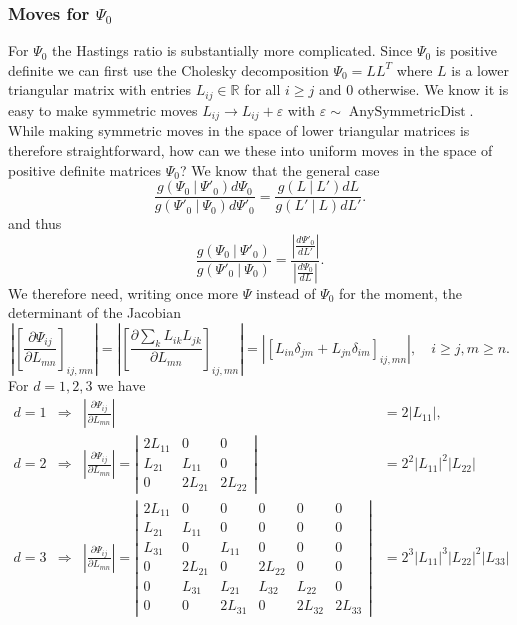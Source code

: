 \documentclass[11pt, oneside]{article}   	%
\begin{document}
\subsubsection{Moves for $\Psi_0$}
For $\Psi_0$ the Hastings ratio is substantially more complicated. Since $\Psi_0$ is positive definite we can first use the Cholesky decomposition $\Psi_0 = L L^T$ where $L$ is a lower triangular matrix with entries $L_{ij}\in\mathbb{R}$ for all $i \ge j$ and $0$ otherwise. We know it is easy to make symmetric moves $L_{ij}\rightarrow L_{ij} + \varepsilon$ with $\varepsilon\sim\operatorname{AnySymmetricDist}$. While making symmetric moves in the space of lower triangular matrices is therefore straightforward, how can we these into uniform moves in the space of positive definite matrices $\Psi_0$? We know that the general case
$$\frac{g(\Psi_0~\vert~\Psi'_0)d\Psi_0}{g(\Psi'_0~\vert~\Psi_0)d\Psi'_0} = \frac{g(L~\vert~L')dL}{g(L'~\vert~L)dL'}.$$
and thus
$$\frac{g(\Psi_0~\vert~\Psi'_0)}{g(\Psi'_0~\vert~\Psi_0)} = \frac{\left\vert\frac{d\Psi'_0}{dL'}\right\vert}{\left\vert\frac{d\Psi_0}{dL}\right\vert}.$$
We therefore need, writing once more $\Psi$ instead of $\Psi_0$ for the moment, the determinant of the Jacobian
$$\left\vert\left[\frac{\partial\Psi_{ij}}{\partial L_{mn}}\right]_{ij,mn}\right\vert = \left\vert\left[\frac{\partial\sum_{k}L_{ik}L_{jk}}{\partial L_{mn}}\right]_{ij,mn}\right\vert = \left\vert\left[L_{in}\delta_{jm} + L_{jn}\delta_{im}\right]_{ij,mn}\right\vert,\quad i\ge j, m\ge n.$$
For $d=1,2,3$ we have
\begin{equation}\begin{aligned}
d = 1 & \Rightarrow & \left\vert\frac{\partial\Psi_{ij}}{\partial L_{mn}}\right\vert &= 2 \vert L_{11}\vert,\\
d = 2 & \Rightarrow & \left\vert\frac{\partial\Psi_{ij}}{\partial L_{mn}}\right\vert = \left\vert\begin{array}{ccc}
2L_{11} & 0 & 0\\
L_{21} & L_{11} & 0 \\
0 & 2L_{21} & 2L_{22}
\end{array}\right\vert &= 2^2 \vert L_{11}\vert^2 \vert L_{22}\vert\\
d = 3 & \Rightarrow &  \left\vert\frac{\partial\Psi_{ij}}{\partial L_{mn}}\right\vert = \left\vert\begin{array}{cccccc}
2L_{11} & 0 & 0 & 0 & 0 & 0 \\
L_{21} & L_{11} & 0 & 0 & 0 & 0 \\
L_{31} & 0 & L_{11} & 0 & 0 & 0 \\
0 & 2 L_{21} & 0 & 2 L_{22} & 0 & 0 \\
0 & L_{31} & L_{21} & L_{32} & L_{22} & 0\\
0 & 0 & 2L_{31} & 0 & 2 L_{32} & 2L_{33}
\end{array}\right\vert &= 2^3 \vert L_{11}\vert^3 \vert L_{22}\vert^2 \vert L_{33}\vert
\end{aligned}\end{equation}
\end{document}
